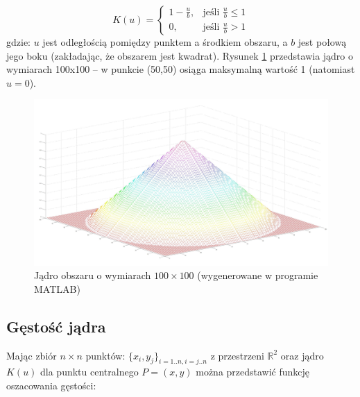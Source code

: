\begin{equation}
\label{eq:ms3}
K(u)=\begin{cases}
1-\frac{u}{b}, & \text{jeśli }\frac{u}{b}\leq 1 \\
0, & \text{jeśli }\frac{u}{b} > 1
\end{cases}
\end{equation}
gdzie: $u$ jest odległością pomiędzy punktem a środkiem obszaru, a $b$ jest połową jego boku (zakładając, że obszarem jest kwadrat). Rysunek \ref{fig:kernel} przedstawia jądro o wymiarach 100x100 -- w punkcie (50,50) osiąga maksymalną wartość 1 (natomiast $u=0$).
\begin{figure}[h]
	\centering
	\captionsetup{justification=centering,margin=1cm}
	\includegraphics[width=12cm]{2_kernel.jpg}
	\caption{Jądro obszaru o wymiarach $100\times100$ (wygenerowane w programie MATLAB)}
	\label{fig:kernel}
\end{figure}

\subsection{Gęstość jądra}
Mając zbiór $n\times n$ punktów: $\{x_{i},y_{j}\}_{i=1..n,i=j..n}$ z przestrzeni $\mathbb{R}^2$ oraz jądro $K(u)$ dla punktu centralnego $P=(x,y)$ można przedstawić funkcję oszacowania gęstości:

